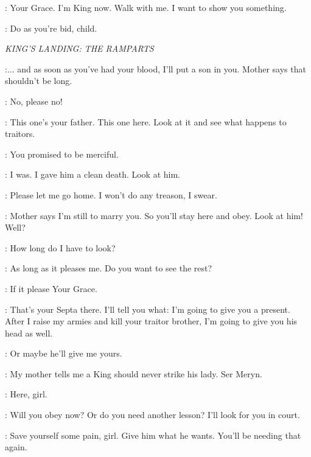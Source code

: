 \JOFFREY: Your Grace. I'm King now. Walk with me. I want to show you something. 

\HOUND: Do as you're bid, child. 


\scene

\textit{KING'S LANDING: THE RAMPARTS} 


\JOFFREY:$\ldots$ and as soon as you've had your blood, I'll put a son in you. Mother says that shouldn't be long. 

\SANSA:  No, please no! 

\JOFFREY: This one's your father. This one here. Look at it and see what happens to traitors. 

\SANSA: You promised to be merciful. 

\JOFFREY: I was. I gave him a clean death. Look at him. 

\SANSA: Please let me go home. I won't do any treason, I swear. 

\JOFFREY: Mother says I'm still to marry you. So you'll stay here and obey. Look at him! Well? 

\SANSA: How long do I have to look? 

\JOFFREY: As long as it pleases me. Do you want to see the rest? 

\SANSA: If it please Your Grace. 

\JOFFREY: That's your Septa there. I'll tell you what: I'm going to give you a present. After I raise my armies and kill your traitor brother, I'm going to give you his head as well. 

\SANSA: Or maybe he'll give me yours. 

\JOFFREY: My mother tells me a King should never strike his lady. Ser Meryn. 


\HOUND: Here, girl. 

\JOFFREY: Will you obey now? Or do you need another lesson? I'll look for you in court. 

\HOUND: Save yourself some pain, girl. Give him what he wants.  You'll be needing that again. 


